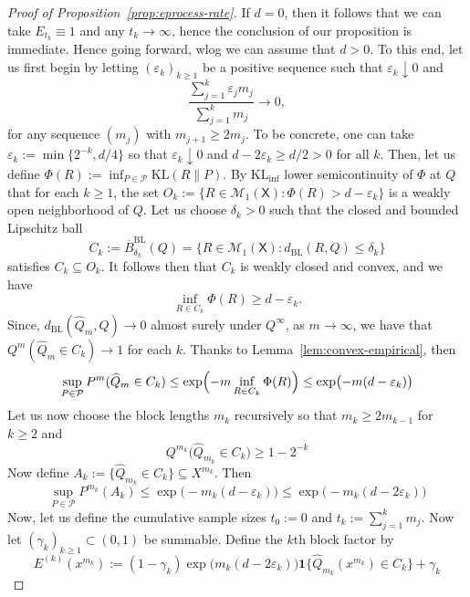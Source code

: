 \documentclass[11pt]{article}
\newcommand{\KL}{\mathrm{KL}}
\newcommand{\KLinf}{\mathrm{KL}_{\mathrm{inf}}}
\newcommand{\Pcal}{\mathcal{P}}
\newcommand{\X}{\mathsf{X}}
\theoremstyle{definition}
\theoremstyle{definition}
\begin{document}
\begin{proof}[Proof of Proposition~\ref{prop:eprocess-rate}]
If $d=0$, then it follows that we can take $E_{t_k}\equiv 1$ and any $t_k\to\infty$, hence the conclusion of our proposition is immediate. Hence going forward, wlog we can assume that $d>0$. To this end, let us first begin by letting $(\varepsilon_k)_{k\ge 1}$ be a positive sequence such that $\varepsilon_k\downarrow 0$ and
\[
\frac{\sum_{j=1}^k\varepsilon_j m_j}{\sum_{j=1}^k m_j}\longrightarrow 0,
\]
for any sequence $(m_j)$ with $m_{j+1}\ge 2m_j$. To be concrete, one can take $\varepsilon_k:=\min\{2^{-k}, d/4\}$ so that $\varepsilon_k\downarrow 0$ and $d-2\varepsilon_k\ge d/2>0$ for all $k$. Then, let us define $\Phi(R):=\inf_{P\in\Pcal}\KL(R\|P)$. By $\KLinf$ lower semicontinuity of $\Phi$ at $Q$ that for each $k\ge 1$, the set $O_k:=\{R\in\mathcal M_1(\X):\Phi(R)>d-\varepsilon_k\}$ is a weakly open neighborhood of $Q$. Let us choose $\delta_k>0$ such that the closed and bounded Lipschitz ball
\[
C_k:=\overline B^{\mathrm{BL}}_{\delta_k}(Q)=\{R\in\mathcal M_1(\X):d_{\mathrm{BL}}(R,Q)\le\delta_k\}
\]
satisfies $C_k\subseteq O_k$. It follows then that $C_k$ is weakly closed and convex, and we have 
\[
\inf_{R\in C_k}\Phi(R)\ge d-\varepsilon_k.
\]
Since, $d_{\mathrm{BL}}(\widehat Q_m, Q)\to 0$ almost surely under $Q^{\infty}$, as $m\to\infty$, we have that $Q^m(\widehat Q_m\in C_k)\to 1$ for each $k$. Thanks to Lemma~\ref{lem:convex-empirical}, then
\[
\sup_{P\in\Pcal} P^m(\widehat Q_m\in C_k) \le \exp\Bigl(-m\inf_{R\in C_k}\Phi(R)\Bigr) \le \exp\bigl(-m(d-\varepsilon_k)\bigr)
\]
Let us now choose the block lengths $m_k$ recursively so that $m_k\ge 2m_{k-1}$ for $k\ge 2$ and
\begin{equation}\label{eq:eproc-Qgood}
Q^{m_k}\bigl(\widehat Q_{m_k}\in C_k\bigr)\ge 1-2^{-k}    
\end{equation}
Now define $A_k:=\{\widehat Q_{m_k}\in C_k\}\subseteq X^{m_k}$. Then
\begin{equation}\label{eq:eproc-betabound}
\sup_{P\in\Pcal}P^{m_k}(A_k) \le \exp\bigl(-m_k(d-\varepsilon_k)\bigr) \le \exp\bigl(-m_k(d-2\varepsilon_k)\bigr)   
\end{equation}
Now, let us define the cumulative sample sizes $t_0:=0$ and $t_k:=\sum_{j=1}^k m_j$. Now let $(\gamma_k)_{k\ge 1}\subset(0,1)$ be summable. Define the $k$th block factor by
\begin{equation}\label{eq:eproc-blockE}
E^{(k)}(x^{m_k}):=(1-\gamma_k)\exp\bigl(m_k(d-2\varepsilon_k)\bigr)\mathbf 1\!\{\widehat Q_{m_k}(x^{m_k})\in C_k\} +\gamma_k    
\end{equation}


\end{proof}
\end{document}
